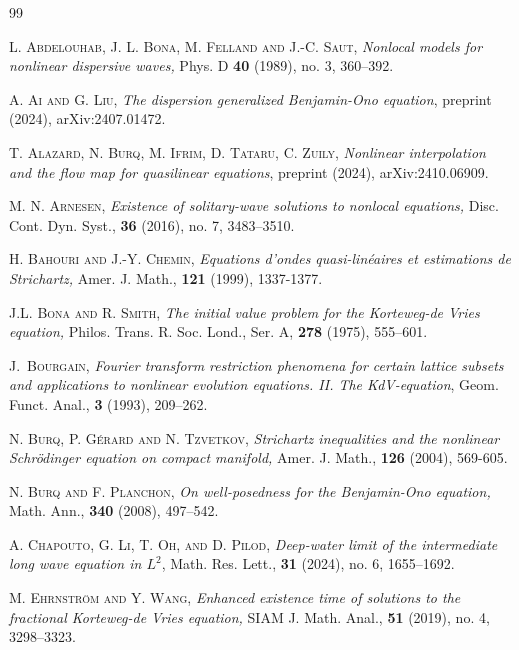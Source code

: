 \documentclass{amsart}
\theoremstyle{definition}
\theoremstyle{remark}
\numberwithin{equation}{section}
\begin{document}

\begin{thebibliography}{99}

 \textsc{L. Abdelouhab, J. L. Bona, M. Felland and J.-C. Saut,}
\newblock \emph{Nonlocal models for nonlinear dispersive waves,}
\newblock Phys. D {\bf 40} (1989), no. 3, 360--392.

 \textsc{A. Ai and G. Liu,}
\newblock \emph{The dispersion generalized Benjamin-Ono equation},
\newblock preprint (2024), arXiv:2407.01472.

 \textsc{T. Alazard, N. Burq, M. Ifrim, D. Tataru, C. Zuily,}
\newblock \emph{Nonlinear interpolation and the flow map for quasilinear equations},
\newblock preprint (2024), arXiv:2410.06909.

 \textsc{M. N. Arnesen},
\newblock \emph{Existence of solitary-wave solutions to nonlocal equations,}
\newblock Disc. Cont. Dyn. Syst., {\bf 36} (2016), no. 7, 3483--3510.


 \textsc{H. Bahouri and J.-Y. Chemin,} 
\emph{Equations d'ondes quasi-lin\'eaires et estimations de Strichartz,}
Amer. J. Math., \textbf{121} (1999), 1337-1377.

\newblock \textsc{J.L. Bona and R. Smith,}
\newblock \emph{The initial value problem for the Korteweg-de Vries equation,}
\newblock Philos. Trans. R. Soc. Lond., Ser. A, \textbf{278} (1975), 555--601.


\newblock \textsc{ J.~Bourgain},
\newblock \emph{Fourier transform restriction phenomena for certain lattice subsets and applications to nonlinear evolution equations. II. The KdV-equation},
\newblock Geom. Funct. Anal., \textbf{3} (1993), 209--262.

 \textsc{N. Burq, P. G\'erard and N. Tzvetkov}, 
\emph{Strichartz inequalities and the nonlinear Schr\"odinger equation on compact manifold,}
Amer. J. Math., \textbf{126} (2004), 569-605.


 \textsc{N. Burq and F. Planchon,}
\newblock \emph{On well-posedness for the Benjamin-Ono equation,}
\newblock Math. Ann., \textbf{340} (2008), 497--542.

 \textsc{A. Chapouto, G. Li, T. Oh, and D. Pilod}, 
\newblock \emph{Deep-water limit of the intermediate long wave
equation in $L^2$}, 
\newblock Math. Res. Lett., {\bf 31} (2024), no. 6, 1655--1692.

 \textsc{M. Ehrnstr\"om and Y. Wang,}
\newblock \emph{Enhanced existence time of solutions to the fractional Korteweg-de Vries equation,}
\newblock SIAM J. Math. Anal., {\bf 51} (2019), no. 4, 3298--3323.


\end{thebibliography}
\end{document}
